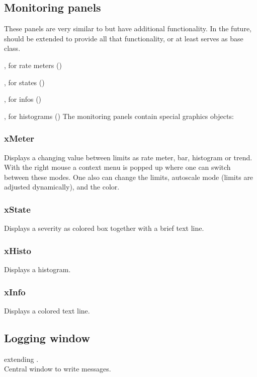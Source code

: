 \subsection{Monitoring panels}
These panels are very similar to  but have additional
functionality. 
 In the future,  should be extended to provide all that functionality, or at least serves as base class.
\bdes
\item [\class{xPanelMeter}:]  , for rate meters ()
\item [\class{xPanelState}:]  , for states ()
\item [\class{xPanelInfo}:]   , for infos ()
\item [\class{xPanelHisto}:]  , for histograms ()
\edes
The monitoring panels contain special graphics objects:
\subsubsection{xMeter}
Displays a changing value between limits as rate meter, bar, histogram or trend.
With the right mouse a context menu is popped up where one can switch between these
modes. One also can change the limits, autoscale mode (limits are adjusted dynamically),
and the color.
\subsubsection{xState}
Displays a severity as colored box together with a brief text line.
\subsubsection{xHisto}
Displays a histogram.
\subsubsection{xInfo}
Displays a colored text line.
\subsection{Logging window}
 extending .\\
Central window to write messages.
